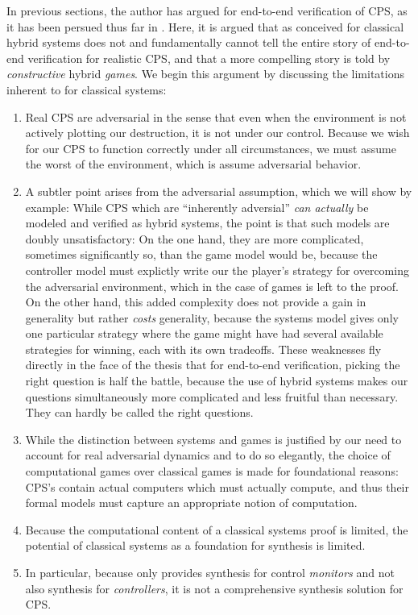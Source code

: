 
In previous sections, the author has argued for end-to-end verification of CPS, as it has been persued thus far in \VeriPhy.
Here, it is argued that \VeriPhy as conceived for classical hybrid systems does not and fundamentally cannot tell the entire story of end-to-end verification for realistic CPS, and that a more compelling story is told by \emph{constructive} hybrid \emph{games}.
We begin this argument by discussing the limitations inherent to \VeriPhy for classical systems:
\begin{enumerate}
\item \label{item:adversarial} Real CPS are adversarial in the sense that even when the environment is not actively plotting our destruction, it is not under our control.
 Because we wish for our CPS to function correctly under all circumstances, we must assume the worst of the environment, which is assume adversarial behavior.
\item \label{item:complexified} A subtler point arises from the adversarial assumption, which we will show by example:
While CPS which are ``inherently adversial'' \emph{can actually} be modeled and verified as hybrid systems, the point is that such models are doubly unsatisfactory: On the one hand, they are more complicated, sometimes significantly so, than the game model would be, because the controller model must explictly write our the player's strategy for overcoming the adversarial environment, which in the case of games is left to the proof.
On the other hand, this added complexity does not provide a gain in generality but rather \emph{costs} generality, because the systems model gives only one particular strategy where the game might have had several available strategies for winning, each with its own tradeoffs.
These weaknesses fly directly in the face of the thesis that for end-to-end verification, picking the right question is half the battle, because the use of hybrid systems makes our questions simultaneously more complicated and less fruitful than necessary. They can hardly be called the right questions.
\item \label{item:realistic} While the distinction between systems and games is justified by our need to account for real adversarial dynamics and to do so elegantly, 
the choice of computational games over classical games is made for foundational reasons: CPS's contain actual computers which must actually compute, and thus their formal models must capture an appropriate notion of computation.
\item \label{item:computational} Because the computational content of a classical systems proof is limited, the potential of classical systems as a foundation for synthesis is limited.
\item \label{item:control-synthesis} In particular, because \VeriPhy only provides synthesis for control \emph{monitors} and not also synthesis for \emph{controllers}, it is not a comprehensive synthesis solution for CPS.
\end{enumerate}
